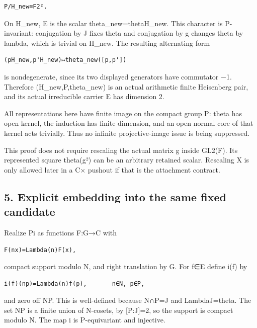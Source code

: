 \begin{Verbatim}[fontsize=\small,breaklines=true,breakanywhere=true]
P/H_new≅F2².
\end{Verbatim}

On H\_new, E is the scalar theta\_new=theta\textbar H\_new. This
character is P-invariant: conjugation by J fixes theta and conjugation
by g changes theta by lambda, which is trivial on H\_new. The resulting
alternating form

\begin{Verbatim}[fontsize=\small,breaklines=true,breakanywhere=true]
(pH_new,p'H_new)↦theta_new([p,p'])
\end{Verbatim}

is nondegenerate, since its two displayed generators have commutator −1.
Therefore (H\_new,P,theta\_new) is an actual arithmetic finite
Heisenberg pair, and its actual irreducible carrier E has dimension 2.

All representations here have finite image on the compact group P: theta
has open kernel, the induction has finite dimension, and an open normal
core of that kernel acts trivially. Thus no infinite projective-image
issue is being suppressed.

This proof does not require rescaling the actual matrix g inside GL2(F).
Its represented square theta(g²) can be an arbitrary retained scalar.
Rescaling X is only allowed later in a C× pushout if that is the
attachment contract.

\hypertarget{rank2-explicit-embedding-into-the-same-fixed-candidate}{%
\subsection{5. Explicit embedding into the same fixed
candidate}\label{rank2-explicit-embedding-into-the-same-fixed-candidate}}

Realize Pi as functions F:G→C with

\begin{Verbatim}[fontsize=\small,breaklines=true,breakanywhere=true]
F(nx)=Lambda(n)F(x),
\end{Verbatim}

compact support modulo N, and right translation by G. For f∈E define
i(f) by

\begin{Verbatim}[fontsize=\small,breaklines=true,breakanywhere=true]
i(f)(np)=Lambda(n)f(p),       n∈N, p∈P,
\end{Verbatim}

and zero off NP. This is well-defined because N∩P=J and
Lambda\textbar J=theta. The set NP is a finite union of N-cosets, by
{[}P:J{]}=2, so the support is compact modulo N. The map i is
P-equivariant and injective.

